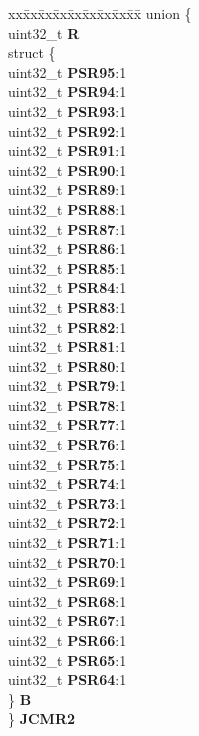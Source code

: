 \begin{DoxyCompactItemize}
\begin{tabbing}
\end{tabbing}\item 
\mbox{\label{structADC__tag_a34577ce088fffb0d4700b2782eb2bce4}} 
\begin{tabbing}
xx\=xx\=xx\=xx\=xx\=xx\=xx\=xx\=xx\=\kill
union \{\\
\>uint32\_t {\bfseries R}\\
\>struct \{\\
\>\>uint32\_t {\bfseries PSR95}:1\\
\>\>uint32\_t {\bfseries PSR94}:1\\
\>\>uint32\_t {\bfseries PSR93}:1\\
\>\>uint32\_t {\bfseries PSR92}:1\\
\>\>uint32\_t {\bfseries PSR91}:1\\
\>\>uint32\_t {\bfseries PSR90}:1\\
\>\>uint32\_t {\bfseries PSR89}:1\\
\>\>uint32\_t {\bfseries PSR88}:1\\
\>\>uint32\_t {\bfseries PSR87}:1\\
\>\>uint32\_t {\bfseries PSR86}:1\\
\>\>uint32\_t {\bfseries PSR85}:1\\
\>\>uint32\_t {\bfseries PSR84}:1\\
\>\>uint32\_t {\bfseries PSR83}:1\\
\>\>uint32\_t {\bfseries PSR82}:1\\
\>\>uint32\_t {\bfseries PSR81}:1\\
\>\>uint32\_t {\bfseries PSR80}:1\\
\>\>uint32\_t {\bfseries PSR79}:1\\
\>\>uint32\_t {\bfseries PSR78}:1\\
\>\>uint32\_t {\bfseries PSR77}:1\\
\>\>uint32\_t {\bfseries PSR76}:1\\
\>\>uint32\_t {\bfseries PSR75}:1\\
\>\>uint32\_t {\bfseries PSR74}:1\\
\>\>uint32\_t {\bfseries PSR73}:1\\
\>\>uint32\_t {\bfseries PSR72}:1\\
\>\>uint32\_t {\bfseries PSR71}:1\\
\>\>uint32\_t {\bfseries PSR70}:1\\
\>\>uint32\_t {\bfseries PSR69}:1\\
\>\>uint32\_t {\bfseries PSR68}:1\\
\>\>uint32\_t {\bfseries PSR67}:1\\
\>\>uint32\_t {\bfseries PSR66}:1\\
\>\>uint32\_t {\bfseries PSR65}:1\\
\>\>uint32\_t {\bfseries PSR64}:1\\
\>\} {\bfseries B}\\
\} {\bfseries JCMR2}\\


\end{tabbing}
\end{DoxyCompactItemize}
